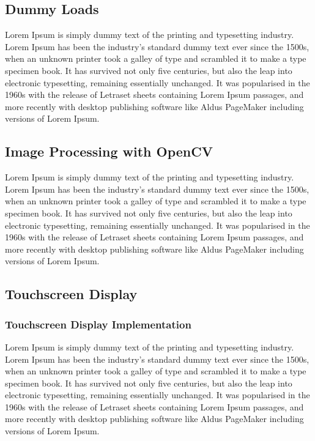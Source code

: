 \subsection{Dummy Loads}
Lorem Ipsum is simply dummy text of the printing and typesetting industry. Lorem Ipsum has been the industry's standard dummy text ever since the 1500s, when an unknown printer took a galley of type and scrambled it to make a type specimen book. It has survived not only five centuries, but also the leap into electronic typesetting, remaining essentially unchanged. It was popularised in the 1960s with the release of Letraset sheets containing Lorem Ipsum passages, and more recently with desktop publishing software like Aldus PageMaker including versions of Lorem Ipsum.

\subsection{Image Processing with OpenCV}
Lorem Ipsum is simply dummy text of the printing and typesetting industry. Lorem Ipsum has been the industry's standard dummy text ever since the 1500s, when an unknown printer took a galley of type and scrambled it to make a type specimen book. It has survived not only five centuries, but also the leap into electronic typesetting, remaining essentially unchanged. It was popularised in the 1960s with the release of Letraset sheets containing Lorem Ipsum passages, and more recently with desktop publishing software like Aldus PageMaker including versions of Lorem Ipsum.

\subsection{Touchscreen Display}
\subsubsection{Touchscreen Display Implementation}
Lorem Ipsum is simply dummy text of the printing and typesetting industry. Lorem Ipsum has been the industry's standard dummy text ever since the 1500s, when an unknown printer took a galley of type and scrambled it to make a type specimen book. It has survived not only five centuries, but also the leap into electronic typesetting, remaining essentially unchanged. It was popularised in the 1960s with the release of Letraset sheets containing Lorem Ipsum passages, and more recently with desktop publishing software like Aldus PageMaker including versions of Lorem Ipsum.

